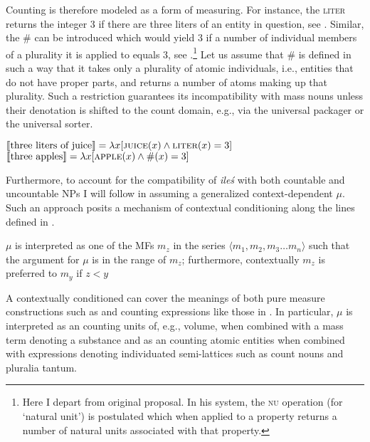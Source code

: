 \documentclass[output=paper, newtxmath, colorlinks, citecolor=brown]{langsci/langscibook}
\begin{document}
	\noindent Counting is therefore modeled as a form of measuring. For instance, the  \textsc{liter} returns the integer 3 if there are three liters of an entity in question, see . Similar, the  \# can be introduced which would yield 3 if a number of individual members of a plurality it is applied to equals 3, see .\footnote{Here I depart from  original proposal. In his system, the \textsc{nu} operation (for `natural unit') is postulated which when applied to a property returns a number of natural units associated with that property.} Let us assume that \# is defined in such a way that it takes only a plurality of atomic individuals, i.e., entities that do not have proper parts, and returns a number of atoms making up that plurality. Such a restriction guarantees its incompatibility with mass nouns unless their denotation is shifted to the count domain, e.g., via the universal packager or the universal sorter.

	\ea \ea $\llbracket\text{three liters of juice}\rrbracket=\lambda x[\textsc{juice}(x) \wedge \textsc{liter}(x)=3]$\label{ex:mf-liter}
	\ex $\llbracket\text{three apples}\rrbracket=\lambda x[\textsc{apple}(x) \wedge \#(x)=3]$\label{ex:mf-cardinality}
	\z
    \z

	\noindent Furthermore, to account for the compatibility of \textit{ileś} with both countable and uncountable NPs I will follow \cite{bale_barner2009interpretation} in assuming a generalized context-dependent  $\mu$. Such an approach posits a mechanism of contextual conditioning along the lines defined in .

    \ea $\mu$ is interpreted as one of the MFs $m_z$ in the series $\langle m_1, m_2, m_3\dots m_n\rangle$ such that the argument for $\mu$ is in the range of $m_z$; furthermore, contextually $m_z$ is preferred to $m_y$ if $z<y$\label{ex:contextual-conditioning-mf}
    \z



    \noindent A contextually conditioned  can cover the meanings of both pure measure constructions such as  and counting expressions like those in . In particular, $\mu$ is interpreted as an  counting units of, e.g., volume, when combined with a mass term denoting a substance and as an  counting atomic entities when combined with expressions denoting individuated semi-lattices such as count nouns and pluralia tantum.
\end{document}
